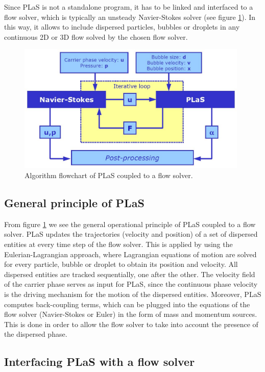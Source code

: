 \documentclass[12pt]{article}
\begin{document}
Since PLaS is not a standalone program, it has to be linked and interfaced to a flow solver, which is typically an unsteady Navier-Stokes solver (see figure \ref{fig:Flowchart}). In this way, it allows to include dispersed particles, bubbles or droplets in any continuous 2D or 3D flow solved by the chosen flow solver.

\begin{figure}[!ht]
	\centering
	\includegraphics[width=11.0cm]{manual.jpg}
  \caption{Algorithm flowchart of PLaS coupled to a flow solver.}
  \label{fig:Flowchart}
\end{figure}

\subsection{General principle of PLaS}
\label{subsec:principle}

From figure \ref{fig:Flowchart} we see the general operational principle of PLaS coupled to a flow solver. PLaS updates the trajectories (velocity and position) of a set of dispersed entities at every time step of the flow solver. This is applied by using the Eulerian-Lagrangian approach, where Lagrangian equations of motion are solved for every particle, bubble or droplet to obtain its position and velocity. All dispersed entities are tracked sequentially, one after the other. The velocity field of the carrier phase serves as input for PLaS, since the continuous phase velocity is the driving mechanism for the motion of the dispersed entities. Moreover, PLaS computes back-coupling terms, which can be plugged into the equations of the flow solver (Navier-Stokes or Euler) in the form of mass and momentum sources. This is done in order to allow the flow solver to take into account the presence of the dispersed phase.

\subsection{Interfacing PLaS with a flow solver}
\label{subsec:interf}
\end{document}
